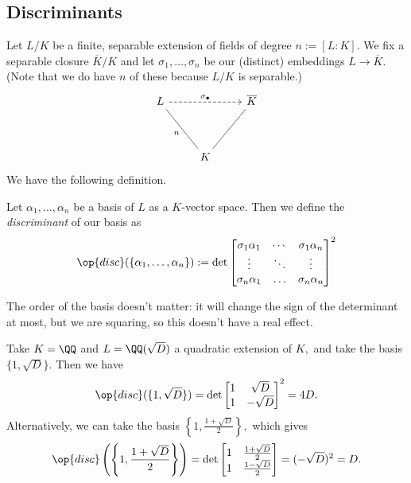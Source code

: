 \documentclass[../notes.tex]{subfiles}
\begin{document}
\subsection{Discriminants}
Let $L/K$ be a finite, separable extension of fields of degree $n:=[L:K].$ We fix a separable closure $\overline K/K$ and let $\sigma_1,\ldots,\sigma_n$ be our (distinct) embeddings $L\to\overline K.$ (Note that we do have $n$ of these because $L/K$ is separable.)
\[\begin{tikzcd}
	L && {\overline K} \\
	\\
	& K
	\arrow["{\sigma_\bullet}", dashed, from=1-1, to=1-3]
	\arrow["n", no head, from=3-2, to=1-1]
	\arrow[no head, from=3-2, to=1-3]
\end{tikzcd}\]
We have the following definition.
\begin{defi}[Discriminant] \label{defi:disc}
    Let $\alpha_1,\ldots,\alpha_n$ be a basis of $L$ as a $K$-vector space. Then we define the \textit{discriminant} of our basis as
    \[\op{disc}(\{\alpha_1,\ldots,\alpha_n\}):=\det\begin{bmatrix}
        \sigma_1\alpha_1 & \cdots & \sigma_1\alpha_n \\
        \vdots & \ddots & \vdots \\
        \sigma_n\alpha_1 & \ldots & \sigma_n\alpha_n
    \end{bmatrix}^2\]
\end{defi}
\begin{remark}
    The order of the basis doesn't matter: it will change the sign of the determinant at most, but we are squaring, so this doesn't have a real effect.
\end{remark}
\begin{ex}
    Take $K=\QQ$ and $L=\QQ(\sqrt D)$ a quadratic extension of $K,$ and take the basis $\{1,\sqrt D\}.$ Then we have
    \[\op{disc}(\{1,\sqrt D\})=\det\begin{bmatrix}
        1 & \sqrt D \\
        1 & -\sqrt D
    \end{bmatrix}^2=4D.\]
    Alternatively, we can take the basis $\left\{1,\frac{1+\sqrt D}2\right\},$ which gives
    \[\op{disc}\left(\left\{1,\frac{1+\sqrt D}2\right\}\right)=\det\begin{bmatrix}
        1 & \frac{1+\sqrt D}2 \\
        1 & \frac{1-\sqrt D}2
    \end{bmatrix}=(-\sqrt D)^2=D.\]
\end{ex}
\end{document}
